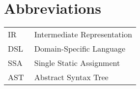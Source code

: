 \chapter*{Abbreviations}


\begin{flushleft}
\begin{tabular}{l p{0.8\linewidth}}
IR      & Intermediate Representation\\
DSL     & Domain-Specific Language\\
SSA     & Single Static Assignment\\
AST     & Abstract Syntax Tree
\end{tabular}
\end{flushleft}

